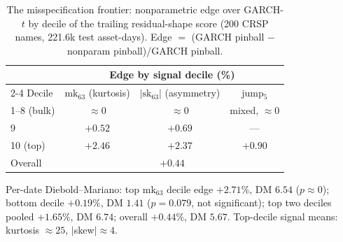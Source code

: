 \documentclass[11pt]{article}
\theoremstyle{remark}
\begin{document}
\begin{table}[t]
\centering
\begin{threeparttable}
\caption{The misspecification frontier: nonparametric edge over
GARCH-$t$ by decile of the trailing residual-shape score (200 CRSP
names, 221.6k test asset-days). Edge $=$ (GARCH pinball $-$ nonparam
pinball)/GARCH pinball.}
\label{tab:frontier}
\begin{tabular}{lccc}
\toprule
& \multicolumn{3}{c}{Edge by signal decile (\%)} \\
\cmidrule(lr){2-4}
Decile & $\mathrm{mk}_{63}$ (kurtosis) & $|\mathrm{sk}_{63}|$ (asymmetry) & jump$_5$ \\
\midrule
1--8 (bulk) & $\approx 0$ & $\approx 0$ & mixed, $\approx 0$ \\
9 & $+0.52$ & $+0.69$ & --- \\
10 (top) & $\mathbf{+2.46}$ & $\mathbf{+2.37}$ & $+0.90$ \\
\midrule
Overall & \multicolumn{3}{c}{$+0.44$} \\
\bottomrule
\end{tabular}
\begin{tablenotes}\footnotesize
\item Per-date Diebold--Mariano: top $\mathrm{mk}_{63}$ decile edge
$+2.71\%$, DM $6.54$ ($p \approx 0$); bottom decile $+0.19\%$, DM $1.41$
($p = 0.079$, not significant); top two deciles pooled $+1.65\%$, DM
$6.74$; overall $+0.44\%$, DM $5.67$. Top-decile signal means: kurtosis
$\approx 25$, $|$skew$| \approx 4$.
\end{tablenotes}
\end{threeparttable}
\end{table}
\end{document}

